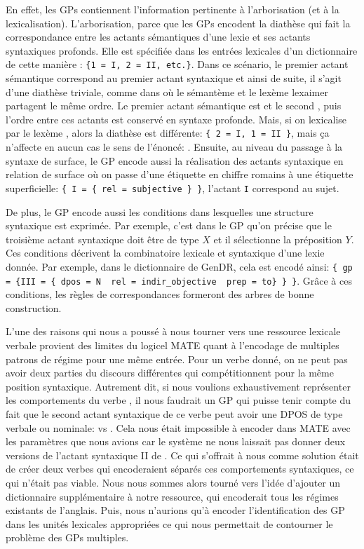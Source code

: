 En effet, les \acp{GP} contiennent l'information pertinente à l'arborisation (et à la lexicalisation). L'arborisation, parce que les \acp{GP} encodent la diathèse qui fait la correspondance entre les actants sémantiques d'une lexie et ses actants syntaxiques profonds. Elle est spécifiée dans les entrées lexicales d'un dictionnaire de cette manière : \lstinline|{1 = I, 2 = II, etc.}|. Dans ce scénario, le premier actant sémantique correspond au premier actant syntaxique et ainsi de suite, il s'agit d'une diathèse triviale, comme dans  où le sémantème  et le lexème lex{aimer} partagent le même ordre. Le premier actant sémantique est  et le second , puis l'ordre entre ces actants est conservé en syntaxe profonde. Mais, si on lexicalise  par le lexème , alors la diathèse est différente: \lstinline|{ 2 = I, 1 = II }|, mais ça n'affecte en aucun cas le sens de l'énoncé: . Ensuite, au niveau du passage à la syntaxe de surface, le \ac{GP} encode aussi la réalisation des actants syntaxique en relation de surface où on passe d'une étiquette en chiffre romains à une étiquette superficielle: \lstinline|{ I = { rel = subjective } }|, l'actant \texttt{I} correspond au sujet.

De plus, le \ac{GP} encode aussi les conditions dans lesquelles une structure syntaxique est exprimée. Par exemple, c'est dans le \ac{GP} qu'on précise que le troisième actant syntaxique doit être de type $X$ et il sélectionne la préposition $Y$. Ces conditions décrivent la combinatoire lexicale et syntaxique d'une lexie donnée. Par exemple, dans le dictionnaire de GenDR, cela est encodé ainsi: \lstinline|{ gp = {III = { dpos = N  rel = indir_objective  prep = to} } }|. Grâce à ces conditions, les règles de correspondances formeront des arbres de bonne construction.

L'une des raisons qui nous a poussé à nous tourner vers une ressource lexicale verbale provient des limites du logicel MATE quant à l'encodage de multiples patrons de régime pour une même entrée. Pour un verbe donné, on ne peut pas avoir deux parties du discours différentes qui compétitionnent pour la même position syntaxique. Autrement dit, si nous voulions exhaustivement représenter les comportements du verbe , il nous faudrait un \ac{GP} qui puisse tenir compte du fait que le second actant syntaxique de ce verbe peut avoir une \ac{DPOS} de type verbale ou nominale:  vs . Cela nous était impossible à encoder dans MATE avec les paramètres que nous avions car le système ne nous laissait pas donner deux versions de l'actant syntaxique II de . Ce qui s'offrait à nous comme solution était de créer deux verbes  qui encoderaient séparés ces comportements syntaxiques, ce qui n'était pas viable. Nous nous sommes alors tourné vers l'idée d'ajouter un dictionnaire supplémentaire à notre ressource, qui encoderait tous les régimes existants de l'anglais. Puis, nous n'aurions qu'à encoder l'identification des \ac{GP} dans les unités lexicales appropriées ce qui nous permettait de contourner le problème des \acp{GP} multiples.

